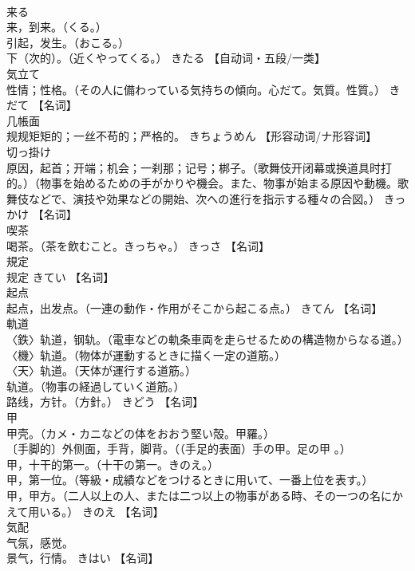 \documentclass[8pt]{extreport}
\begin{document}
\begin{CJK}{UTF8}{min}
\\	来る	
\\	来，到来。（くる。） 
\\	引起，发生。（おこる。） 
\\	下（次的）。（近くやってくる。）	きたる		【自动词・五段/一类】
\\	気立て	
\\	性情；性格。（その人に備わっている気持ちの傾向。心だて。気質。性質。）	きだて		【名词】
\\	几帳面	
\\	规规矩矩的；一丝不苟的；严格的。	きちょうめん		【形容动词/ナ形容词】
\\	切っ掛け	
\\	原因，起首；开端；机会；一刹那；记号；梆子。（歌舞伎开闭幕或换道具时打的。）（物事を始めるための手がかりや機会。また、物事が始まる原因や動機。歌舞伎などで、演技や効果などの開始、次への進行を指示する種々の合図。）	きっかけ		【名词】
\\	喫茶	
\\	喝茶。（茶を飲むこと。きっちゃ。）	きっさ		【名词】
\\	規定	
\\	规定	きてい		【名词】
\\	起点	
\\	起点，出发点。（一連の動作・作用がそこから起こる点。）	きてん		【名词】
\\	軌道	
\\	〈鉄〉轨道，钢轨。（電車などの軌条車両を走らせるための構造物からなる道。） 
\\	〈機〉轨道。（物体が運動するときに描く一定の道筋。） 
\\	〈天〉轨道。（天体が運行する道筋。） 
\\	轨道。（物事の経過していく道筋。） 
\\	路线，方针。（方針。）	きどう		【名词】
\\	甲	
\\	甲壳。（カメ・カニなどの体をおおう堅い殻。甲羅。） 
\\	〔手脚的〕外侧面，手背，脚背。（（手足的表面）手の甲。足の甲 。） 
\\	甲，十干的第一。（十干の第一。きのえ。） 
\\	甲，第一位。（等級・成績などをつけるときに用いて、一番上位を表す。） 
\\	甲，甲方。（二人以上の人、または二つ以上の物事がある時、その一つの名にかえて用いる。）	きのえ		【名词】
\\	気配	
\\	气氛，感觉。 
\\	景气，行情。	きはい		【名词】

\end{CJK}
\end{document}
